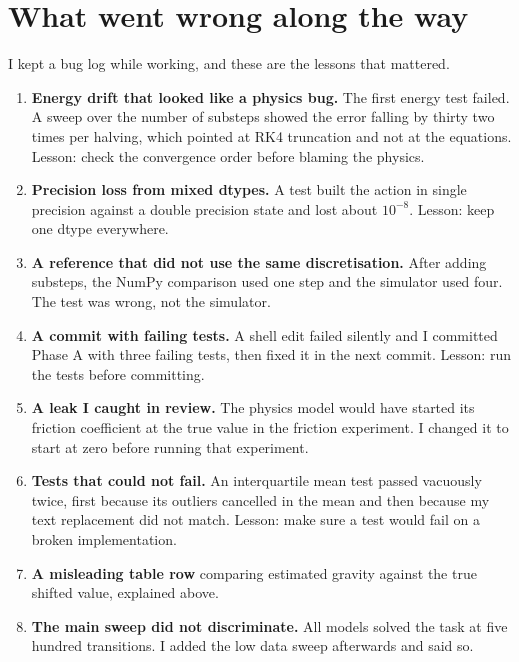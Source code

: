 \documentclass[11pt,a4paper]{article}
\begin{document}
\section{What went wrong along the way}
I kept a bug log while working, and these are the lessons that mattered.
\begin{enumerate}[leftmargin=1.8em]
\item \textbf{Energy drift that looked like a physics bug.} The first energy test failed. A sweep over the number of substeps showed the error falling by thirty two times per halving, which pointed at RK4 truncation and not at the equations. Lesson: check the convergence order before blaming the physics.
\item \textbf{Precision loss from mixed dtypes.} A test built the action in single precision against a double precision state and lost about $10^{-8}$. Lesson: keep one dtype everywhere.
\item \textbf{A reference that did not use the same discretisation.} After adding substeps, the NumPy comparison used one step and the simulator used four. The test was wrong, not the simulator.
\item \textbf{A commit with failing tests.} A shell edit failed silently and I committed Phase A with three failing tests, then fixed it in the next commit. Lesson: run the tests before committing.
\item \textbf{A leak I caught in review.} The physics model would have started its friction coefficient at the true value in the friction experiment. I changed it to start at zero before running that experiment.
\item \textbf{Tests that could not fail.} An interquartile mean test passed vacuously twice, first because its outliers cancelled in the mean and then because my text replacement did not match. Lesson: make sure a test would fail on a broken implementation.
\item \textbf{A misleading table row} comparing estimated gravity against the true shifted value, explained above.
\item \textbf{The main sweep did not discriminate.} All models solved the task at five hundred transitions. I added the low data sweep afterwards and said so.
\end{enumerate}

\end{document}
